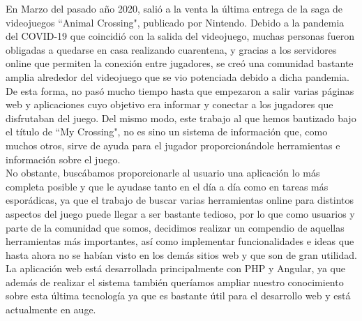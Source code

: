 
En Marzo del pasado año 2020, salió a la venta la última entrega de la saga de videojuegos ``Animal Crossing", publicado por Nintendo. Debido a la pandemia del COVID-19 que coincidió con la salida del videojuego, muchas personas fueron obligadas a quedarse en casa realizando cuarentena, y gracias a los servidores online que permiten la conexión entre jugadores, se creó una comunidad bastante amplia alrededor del videojuego que se vio potenciada debido a dicha pandemia.\\

De esta forma, no pasó mucho tiempo hasta que empezaron a salir varias páginas web y aplicaciones cuyo objetivo era informar y conectar a los jugadores que disfrutaban del juego. Del mismo modo, este trabajo al que hemos bautizado bajo el título de ``My Crossing", no es sino un sistema de información que, como muchos otros, sirve de ayuda para el jugador proporcionándole herramientas e información sobre el juego.\\

No obstante, buscábamos proporcionarle al usuario una aplicación lo más completa posible y que le ayudase tanto en el día a día como en tareas más esporádicas, ya que el trabajo de buscar varias herramientas online para distintos aspectos del juego puede llegar a ser bastante tedioso, por lo que como usuarios y parte de la comunidad que somos, decidimos realizar un compendio de aquellas herramientas más importantes, así como implementar funcionalidades e ideas que hasta ahora no se habían visto en los demás sitios web y que son de gran utilidad.\\

La aplicación web está desarrollada principalmente con PHP y Angular, ya que además de realizar el sistema también queríamos ampliar nuestro conocimiento sobre esta última tecnología ya que es bastante útil para el desarrollo web y está actualmente en auge.

